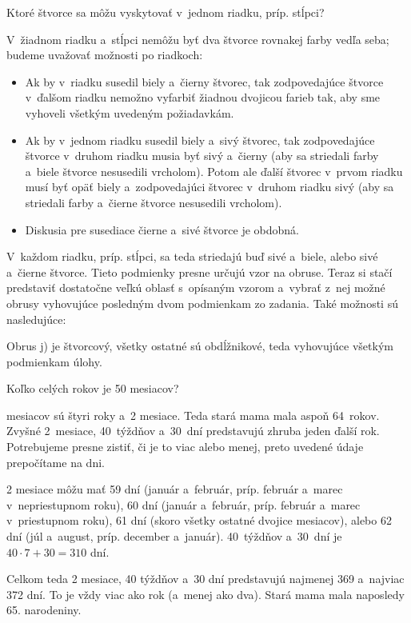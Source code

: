 {%
\napad
Ktoré štvorce sa môžu vyskytovať v~jednom riadku, príp. stĺpci?

\riesenie
V~žiadnom riadku a~stĺpci nemôžu byť dva štvorce rovnakej farby vedľa seba; budeme uvažovať možnosti po riadkoch:
\begin{itemize}
\item
Ak by v~riadku susedil biely a~čierny štvorec, tak zodpovedajúce štvorce v~ďalšom riadku nemožno vyfarbiť žiadnou dvojicou farieb tak, aby sme vyhoveli všetkým uvedeným požiadavkám.
\item Ak by v~jednom riadku susedil biely a~sivý štvorec, tak zodpovedajúce štvorce v~druhom riadku musia byť sivý a~čierny (aby sa striedali farby a~biele štvorce nesusedili vrcholom).
Potom ale ďalší štvorec v~prvom riadku musí byť opäť biely a~zodpovedajúci štvorec v~druhom riadku sivý (aby sa striedali farby a~čierne štvorce nesusedili vrcholom).
%
\item
Diskusia pre susediace čierne a~sivé štvorce je obdobná.
\end{itemize}

V~každom riadku, príp. stĺpci, sa teda striedajú buď sivé a~biele, alebo sivé a~čierne štvorce.
Tieto podmienky presne určujú vzor na obruse.
Teraz si stačí predstaviť dostatočne veľkú oblasť s~opísaným vzorom a~vybrať z~nej možné obrusy vyhovujúce posledným dvom podmienkam zo zadania.
Také možnosti sú nasledujúce:
%


Obrus j) je štvorcový, všetky ostatné sú obdĺžnikové, teda vyhovujúce všetkým podmienkam úlohy.
}

{%
\napad
Koľko celých rokov je 50 mesiacov?

 mesiacov sú štyri roky a~2 mesiace.
Teda stará mama mala aspoň 64~rokov.
Zvyšné 2~mesiace, 40~týždňov a~30~dní predstavujú zhruba jeden ďalší rok.
Potrebujeme presne zistiť, či je to viac alebo menej, preto uvedené údaje prepočítame na dni.

2 mesiace môžu mať
59 dní (január a~február, príp. február a~marec v~nepriestupnom roku),
60 dní (január a~február, príp. február a~marec v~priestupnom roku),
61 dní (skoro všetky ostatné dvojice mesiacov), alebo
62 dní (júl a~august, príp. december a~január).
40~týždňov a~30~dní je $40\cdot7+30=310$ dní.

Celkom teda 2 mesiace, 40 týždňov a~30 dní predstavujú najmenej 369 a~najviac 372 dní.
To je vždy viac ako rok (a~menej ako dva).
Stará mama mala naposledy 65. narodeniny.
}

